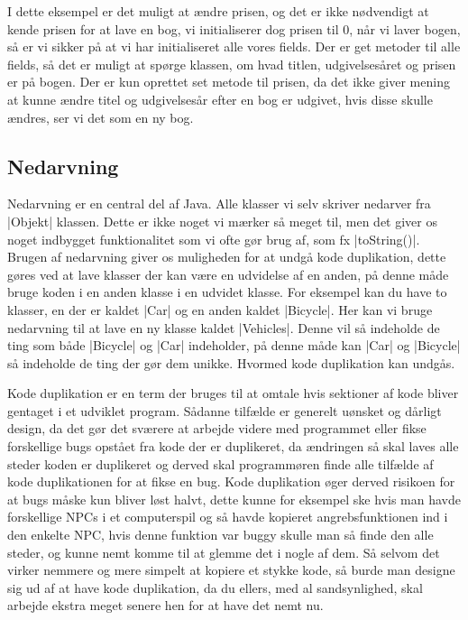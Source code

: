 I dette eksempel er det muligt at ændre prisen, og det er ikke nødvendigt at kende prisen for at lave en bog, vi initialiserer dog prisen til 0, når vi laver bogen, så er vi sikker på at vi har initialiseret alle vores fields. Der er get metoder til alle fields, så det er muligt at spørge klassen, om hvad titlen, udgivelsesåret og prisen er på bogen. Der er kun oprettet set metode til prisen, da det ikke giver mening at kunne ændre titel og udgivelsesår efter en bog er udgivet, hvis disse skulle ændres, ser vi det som en ny bog.

\subsection{Nedarvning}

Nedarvning er en central del af Java. Alle klasser vi selv skriver nedarver fra \JavaInline|Objekt| klassen. Dette er ikke noget vi mærker så meget til, men det giver os noget indbygget funktionalitet som vi ofte gør brug af, som fx \JavaInline|toString()|. Brugen af nedarvning giver os muligheden for at undgå kode duplikation, dette gøres ved at lave klasser der kan være en udvidelse af en anden, på denne måde bruge koden i en anden klasse i en udvidet klasse. For eksempel kan du have to klasser, en der er kaldet \JavaInline|Car| og en anden kaldet \JavaInline|Bicycle|. Her kan vi bruge nedarvning til at lave en ny klasse kaldet \JavaInline|Vehicles|. Denne vil så indeholde de ting som både \JavaInline|Bicycle| og \JavaInline|Car| indeholder, på denne måde kan \JavaInline|Car| og \JavaInline|Bicycle| så indeholde de ting der gør dem unikke. Hvormed kode duplikation kan undgås.

Kode duplikation er en term der bruges til at omtale hvis sektioner af kode bliver gentaget i et udviklet program. Sådanne tilfælde er generelt uønsket og dårligt design, da det gør det sværere at arbejde videre med programmet eller fikse forskellige bugs opstået fra kode der er duplikeret, da ændringen så skal laves alle steder koden er duplikeret og derved skal programmøren finde alle tilfælde af kode duplikationen for at fikse en bug. Kode duplikation øger derved risikoen for at bugs måske kun bliver løst halvt, dette kunne for eksempel ske hvis man havde forskellige NPCs i et computerspil og så havde kopieret angrebsfunktionen ind i den enkelte NPC, hvis denne funktion var buggy skulle man så finde den alle steder, og kunne nemt komme til at glemme det i nogle af dem. Så selvom det virker nemmere og mere simpelt at kopiere et stykke kode, så burde man designe sig ud af at have kode duplikation, da du ellers, med al sandsynlighed, skal arbejde ekstra meget senere hen for at have det nemt nu.


